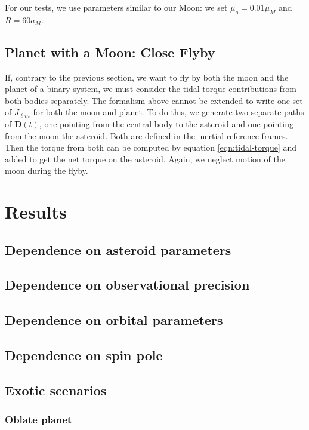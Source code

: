 \documentclass[11pt]{article}
\begin{document}
For our tests, we use parameters similar to our Moon: we set $\mu_o = 0.01 \mu_M$ and $R = 60 a_M$.


\subsection{Planet with a Moon: Close Flyby}
If, contrary to the previous section, we want to fly by both the moon and the planet of a binary system, we must consider the tidal torque contributions from both bodies separately. The formalism above cannot be extended to write one set of $J_{\ell m}$ for both the moon and planet. To do this, we generate two separate paths of $\bm D(t)$, one pointing from the central body to the asteroid and one pointing from the moon the asteroid. Both are defined in the inertial reference frames. Then the torque from both can be computed by equation \ref{eqn:tidal-torque} and added to get the net torque on the asteroid. Again, we neglect motion of the moon during the flyby.



\section{Results}
\subsection{Dependence on asteroid parameters}

\subsection{Dependence on observational precision}

\subsection{Dependence on orbital parameters}

\subsection{Dependence on spin pole}

\subsection{Exotic scenarios}

\subsubsection{Oblate planet}
\end{document}
